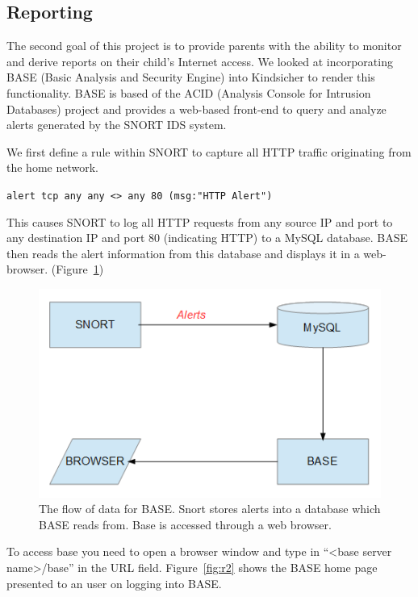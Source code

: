 
\subsection{Reporting}

The second goal of this project is to provide parents with the ability to
monitor and derive reports on their child's Internet access.
%
We looked at incorporating BASE (Basic Analysis and Security Engine) into
Kindsicher to render this functionality.
%
BASE is based of the ACID (Analysis Console for Intrusion Databases) project
and provides a web-based front-end to query and analyze alerts generated by the
SNORT IDS system.

We first define a rule within SNORT to capture all HTTP traffic originating
from the home network.

\verb+alert tcp any any <> any 80 (msg:"HTTP Alert")+

This causes SNORT to log all HTTP requests from any source IP and port to any
destination IP and port 80 (indicating HTTP) to a MySQL database.
%
BASE then reads the alert information from this database and displays it in a
web-browser. (Figure~\ref{fig:r1})

\begin{figure}[!t]
    \centering
    \includegraphics[width=\columnwidth]{figures/R1_BASE_Flow}
    \caption{The flow of data for BASE. Snort stores alerts into a database
    which BASE reads from. Base is accessed through a web browser.}
    \label{fig:r1}
\end{figure}

To access base you need to open a browser window and type in ``<base server
name>/base'' in the URL field.
%
Figure~\ref{fig:r2} shows the BASE home page presented to an user on logging
into BASE.


